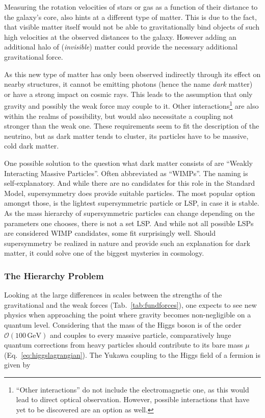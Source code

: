 \noindent Measuring the rotation velocities of stars or gas as a function of their distance to the galaxy's core, also hints at a different type of matter. This is due to the fact, that visible matter itself would not be able to gravitationally bind objects of such high velocities at the observed distances to the galaxy. However adding an additional halo of (\textit{invisible}) matter could provide the necessary additional gravitational force.

As this new type of matter has only been observed indirectly through its effect on nearby structures, it cannot be emitting photons (hence the name \textit{dark} matter) or have a strong impact on cosmic rays. This leads to the assumption that only gravity and possibly the weak force may couple to it. Other interactions\footnote{``Other interactions'' do not include the electromagnetic one, as this would lead to direct optical observation. However, possible interactions that have yet to be discovered are an option as well.} are also within the realms of possibility, but would also necessitate a coupling not stronger than the weak one. These requirements seem to fit the description of the neutrino, but as dark matter tends to cluster, its particles have to be massive, cold dark matter.

One possible solution to the question what dark matter consists of are ``Weakly Interacting Massive Particles''. Often abbreviated as ``WIMPs''. The naming is self-explanatory. And while there are no candidates for this role in the Standard Model, supersymmetry does provide suitable particles. The most popular option amongst those, is the lightest supersymmetric particle or LSP, in case it is stable. As the mass hierarchy of supersymmetric particles can change depending on the parameters one chooses, there is not a set LSP. And while not all possible LSPs are considered WIMP candidates, some fit surprisingly well. Should supersymmetry be realized in nature and provide such an explanation for dark matter, it could solve one of the biggest mysteries in cosmology.



\subsubsection{The Hierarchy Problem}
\label{sec:hierprob}
Looking at the large differences in scales between the strengths of the gravitational and the weak forces (Tab.~\ref{tab:fundforces}), one expects to see new physics when approaching the point where gravity becomes non-negligible on a quantum level. Considering that the mass of the Higgs boson is of the order $\mathcal{O}(100\,\text{GeV})$ and couples to every massive particle, comparatively huge quantum corrections from heavy particles should contribute to its bare mass $\mu$ (Eq.~\ref{eq:higgslagrangian}). The Yukawa coupling to the Higgs field of a fermion is given by

